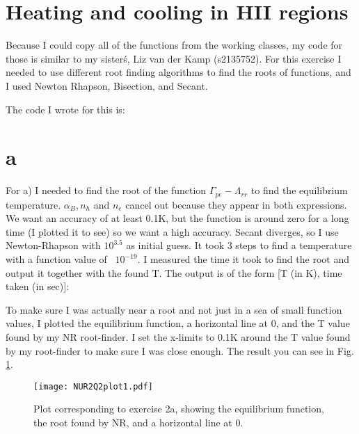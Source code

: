 \section{Heating and cooling in HII regions}

Because I could copy all of the functions from the working classes, 
my code for those is similar to my sister\'s, Liz van der Kamp (s2135752). 
For this exercise I needed to use different root finding algorithms to find the roots of functions, and I 
used Newton Rhapson, Bisection, and Secant.

The code I wrote for this is:


\section{a}

For a) I needed to find the root of the function $\Gamma_{pe} - \Lambda_{rr}$ to find the equilibrium 
temperature. $\alpha_B, n_h$ and $n_e$ cancel out because they appear in both expressions.
We want an accuracy of at least 0.1K, but the function is around zero for a long time (I plotted it to see) 
so we want a high accuracy.
Secant diverges, so I use Newton-Rhapson with $10^{3.5}$ as initial guess. It took 3 steps to find a temperature 
with a function value of ~$10^{-19}$. I measured the time it took to find the root and output it together with
the found T. The output is of the form [T (in K), time taken (in sec)]:


To make sure I was actually near a root and not just in a sea of small function values, I plotted the 
equilibrium function, a horizontal line at 0, and the T value found by my NR root-finder. I set the 
x-limits to 0.1K around the T value found by my root-finder to make sure I was close enough.
The result you can see in Fig. \ref{fig:fig1}.

\begin{figure}[h!]
  \centering
  \texttt{[image: NUR2Q2plot1.pdf]}
  \caption{Plot corresponding to exercise 2a, showing the equilibrium function, the root found by NR, and
  a horizontal line at 0.}
  \label{fig:fig1}
\end{figure} 
